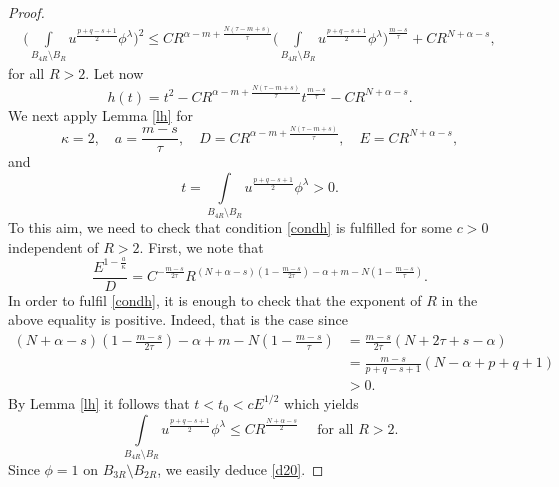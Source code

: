 \documentclass[leqno,12pt]{article}
\numberwithin{equation}{section}
\begin{document}
\begin{proof}
\begin{equation}
\begin{aligned}
\Big(\int\limits_{B_{4R}\setminus B_R} u^{\frac{p+q-s+1}{2}}\phi^\lambda \Big)^2
\leq 
CR^{\alpha-m+\frac{N(\tau-m+s)}{\tau}} \Big(\int\limits_{B_{4R}\setminus B_R} u^{\frac{p+q-s+1}{2}}\phi^{\lambda}\Big)^{\frac{m-s}{\tau}}+CR^{N+\alpha-s},
\end{aligned}
\end{equation}
for all $R>2$. Let now
$$
h(t)=t^2-CR^{\alpha-m+\frac{N(\tau-m+s)}{\tau}} t^{\frac{m-s}{\tau}}-CR^{N+\alpha-s}.
$$
We next apply Lemma \ref{lh} for 
$$
\kappa=2,\quad a=\frac{m-s}{\tau},\quad D=CR^{\alpha-m+\frac{N(\tau-m+s)}{\tau}}, \quad E=CR^{N+\alpha-s},
$$
and
$$
t=\int\limits_{B_{4R}\setminus B_R} u^{\frac{p+q-s+1}{2}}\phi^\lambda>0.
$$
To this aim, we need to check that condition \eqref{condh} is fulfilled for some $c>0$ independent of $R>2$. First, we note that
$$
\frac{E^{1-\frac{a}{\kappa}}}{D}=C^{-\frac{m-s}{2\tau}} R^{(N+\alpha-s)(1-\frac{m-s}{2\tau})-\alpha+m-N(1-\frac{m-s}{\tau})}.
$$
In order to fulfil \eqref{condh}, it is enough to check that the exponent of $R$ in the above equality is positive. Indeed, that is the case since
$$
\begin{aligned}
(N+\alpha-s)(1-\frac{m-s}{2\tau})-\alpha+m-N(1-\frac{m-s}{\tau})
&=\frac{m-s}{2\tau}(N+2\tau+s-\alpha)\\
&=\frac{m-s}{p+q-s+1}(N-\alpha+p+q+1)\\
&>0.
\end{aligned}
$$
By Lemma \ref{lh} it follows that $t<t_0<cE^{1/2}$ which yields 
$$
\int\limits_{B_{4R}\setminus B_R} u^{\frac{p+q-s+1}{2}}\phi^\lambda \leq C R^{\frac{N+\alpha-s}{2}} \quad\mbox{ for all }R>2.
$$
Since $\phi=1$ on $B_{3R}\setminus B_{2R}$, we easily deduce \eqref{d20}.
\end{proof}
\end{document}
